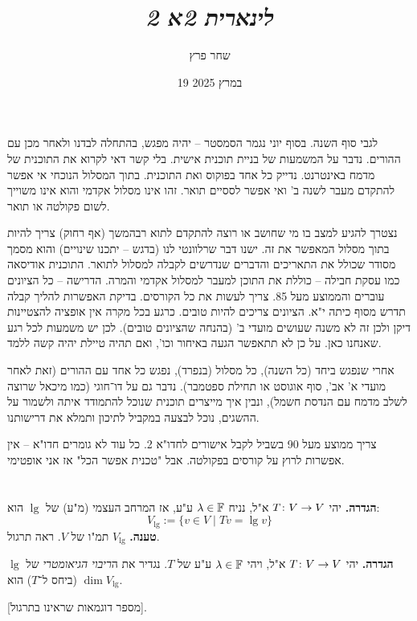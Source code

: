 \documentclass[]{../../../../tex/classes/styledArticle}
\author{שחר פרץ}
\title{\textit{לינארית 2א 2}}
\date{19 במרץ 2025}
\begin{document}
	\maketitle
	\section{}
	לגבי סוף השנה. בסוף יוני נגמר הסמסטר – יהיה מפגש, בהתחלה לבדנו ולאחר מכן עם ההורים. נדבר על המשמעות של בניית תוכנית אישית. בלי קשר דאי לקרוא את התוכנית של מדמח באינטרנט. נדייק כל אחד בפוקוס ואת התוכנית. בתוך המסלול הנוכחי אי אפשר להתקדם מעבר לשנה ב' ואי אפשר לססיים תואר. זהו אינו מסלול אקדמי והוא אינו משוייך לשום פקולטה או תואר. 
	
	נצטרך להגיע למצב בו מי שחושב או רוצה להתקדם לתוא רבהמשך (אף רחוק) צריך להיות בתוך מסלול המאפשר את זה. ישנו דבר שרלוונטי לנו (בדגש – יתכנו שינויים) והוא מסמך מסודר שכולל את התאריכים והדברים שנדרשים לקבלה למסלול לתואר. התוכנית אודיסאה כמו עסקת חבילה – כוללת את התוכן למעבר למסלול אקדמי והמרה. הדרישה – כל הציונים עוברים והממוצע מעל 85. צריך לעשות את כל הקורסים. בדיקת האפשרות להליך קבלה תדרש מסוף כיתה י"א. הציונים צריכים להיות טובים. כרגע בכל מקרה אין אופציה להצטיינות דיקן ולכן זה לא משנה שעושים מועדי ב' (בהנחה שהציונים טובים). לכן יש משמעות לכל רגע שאנחנו כאן. על כן לא תתאפשר הגעה באיחור וכו', ואם תהיה טיילת יהיה קשה ללמד. 
	
	אחרי שנפגש ביחד (כל השנה), כל מסלול (בנפרד), נפגש כל אחד עם ההורים (זאת לאחר מועדי א' אב', סוף אוגוסט או תחילת ספטמבר). נדבר גם על דו־חוגי (כמו מיכאל שרוצה לשלב מדמח עם הנדסת חשמל), ונבין איך מייצרים תוכנית שנוכל להתמודד איתה ולשמור על ההשגים, נוכל לבצעה במקביל לתיכון ותמלא את דרישותנו. 
	
	צריך ממוצע מעל 90 בשביל לקבל אישורים לחדו"א 2. כל עוד לא גומרים חדו"א – אין אפשרות לרוץ על קורסים בפקולטה. אבל "טכנית אפשר הכל" אז אני אופטימי. 
	
	\section{}
	\textbf{הגדרה. }יהי $T \colon V \to V$ א"ל, נניח $\lambda \in \mathbb{F}$ ע"ע, אז המרחב העצמי (מ"ע) של $\lg$ הוא: 
	\[ V_\lg := \{v \in V \mid Tv = \lg v\} \]
	\textbf{טענה. }$V_\lg$ תמ"ו של $V$. ראה תרגול. 
	
	\textbf{הגדרה. }יהי $T \colon V \to V$ א"ל, ויהי $\lambda \in \mathbb{F}$ ע"ע של $T$. נגדיר את ה\textit{ריבוי הגיאומטרי} של $\lg$ (ביחס ל־$T$) הוא $\dim V_\lg$. 
	
	[מספר דוגמאות שראינו בתרגול]. 
	
\end{document}
